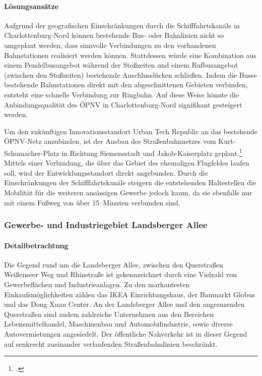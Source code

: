 \paragraph{Lösungsansätze}

Aufgrund der geografischen Einschränkungen durch die Schifffahrtskanäle in Charlottenburg-Nord können bestehende Bus- oder Bahnlinien nicht so umgeplant werden, dass sinnvolle Verbindungen zu den vorhandenen Bahnstationen realisiert werden können. Stattdessen würde eine Kombination aus einem Pendelbusangebot während der Stoßzeiten und einem Rufbusangebot (zwischen den Stoßzeiten) bestehende Anschlusslücken schließen. Indem die Busse bestehende Bahnstationen direkt mit den abgeschnittenen Gebieten verbinden, entsteht eine schnelle Verbindung zur Ringbahn. Auf diese Weise könnte die Anbindungsqualität des ÖPNV in Charlottenburg-Nord signifikant gesteigert werden.

Um den zukünftigen Innovationsstandort Urban Tech Republic an das bestehende ÖPNV-Netz anzubinden, ist der Ausbau des Straßenbahnnetzes vom Kurt-Schumacher-Platz in Richtung Siemensstadt und Jakob-Kaiserplatz geplant.\footcite{NahverkehrsplanBerlin} Mittels einer Verbindung, die über das Gebiet des ehemaligen Flugfeldes laufen soll, wird der Entwicklungsstandort direkt angebunden. Durch die Einschränkungen der Schifffahrtskanäle steigern die entstehenden Haltestellen die Mobilität für die weiteren ansässigen Gewerbe jedoch kaum, da sie ebenfalls nur mit einem Fußweg von über 15~Minuten verbunden sind.

\subsubsection{Gewerbe- und Industriegebiet Landsberger Allee}
\paragraph{Detailbetrachtung}
Die Gegend rund um die Landsberger Allee, zwischen den Querstraßen Weißenseer Weg und Rhinstraße ist gekennzeichnet durch eine Vielzahl von Gewerbeflächen und Industrieanlagen. Zu den markantesten Einkaufsmöglichkeiten zählen das IKEA Einrichtungshaus, der Baumarkt Globus und das Dong Xuan Center. An der Landsberger Allee und den angrenzenden Querstraßen sind zudem zahlreiche Unternehmen aus den Bereichen Lebensmittelhandel, Maschinenbau und Automobilindustrie, sowie diverse Autovermietungen angesiedelt. Der öffentliche Nahverkehr ist in dieser Gegend auf senkrecht zueinander verlaufenden Straßenbahnlinien beschränkt.

